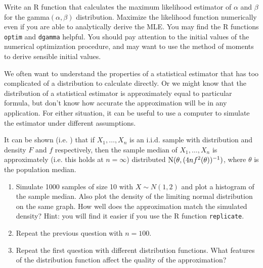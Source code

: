 

\begin{hw}
  Write an R function that calculates the maximum likelihood
  estimator of $\alpha$ and $\beta$ for the gamma$(\alpha,\beta)$
  distribution. Maximize the likelihood function numerically even if
  you are able to analytically derive the MLE. You may find the R
  functions \texttt{optim} and \texttt{dgamma} helpful. You should
  pay attention to the initial values of the numerical optimization
  procedure, and may want to use the method of moments to derive
  sensible initial values.
\end{hw}

\begin{hw}
  We often want to understand the properties of a statistical
  estimator that has too complicated of a distribution to calculate
  directly. Or we might know that the distribution of a statistical
  estimator is approximately equal to particular formula, but don't
  know how accurate the approximation will be in any application. For
  either situation, it can be useful to use a computer to simulate the
  estimator under different assumptions.

  It can be shown (i.e. \citet[p. 483]{CB02}) that if $X_1,\dots,X_n$
  is an i.i.d. sample with distribution and density $F$ and $f$
  respectively, then the sample median of $X_1,\dots,X_n$ is
  approximately (i.e. this holds at $n = \infty$) distributed $\operatorname{N}(\theta,
  (4 n f^2(\theta))^{-1})$, where $\theta$ is the population median.
  \begin{enumerate}
  \item Simulate 1000 samples of size 10 with $X \sim N(1,2)$ and plot
    a histogram of the sample median. Also plot the density of the
    limiting normal distribution on the same graph. How well does the
    approximation match the simulated density? Hint: you will find it
    easier if you use the R function \texttt{replicate}.
  \item Repeat the previous question with $n=100$.
  \item Repeat the first question with different distribution
    functions. What features of the distribution function affect the
    quality of the approximation?
  \end{enumerate}
\end{hw}

